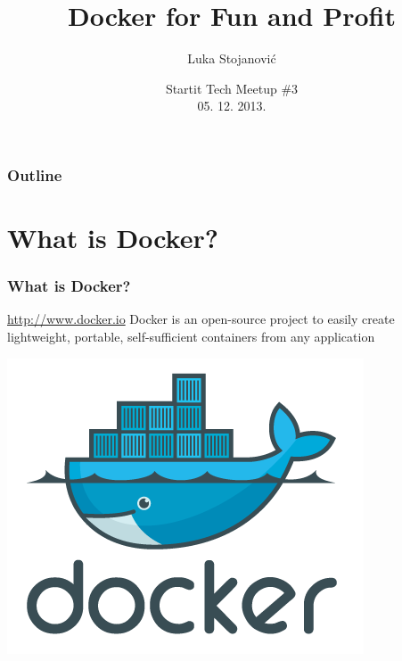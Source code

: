 \documentclass{beamer}
\title{Docker for Fun and Profit}
\author{Luka Stojanović}
\institute{
  luka@magrathea.rs \\
  Seven Bridges Genomics
}
\date{Startit Tech Meetup \#3\\ 05. 12. 2013.}
\begin{document}
  \begin{frame}
    \titlepage
  \end{frame}
  
  \begin{frame}
    \frametitle{Outline}
    \tableofcontents
  \end{frame}
  
  \section{What is Docker?}
  \begin{frame}
    \frametitle{What is Docker?}
    \begin{block}{\url{http://www.docker.io}}
    	Docker is an open-source project to easily create lightweight, 
    	portable, self-sufficient containers from any application
    \end{block}

    \centering
	    \includegraphics[scale=0.5]{homepage-docker-logo.png}
    
    
  \end{frame}
  
\end{document}

